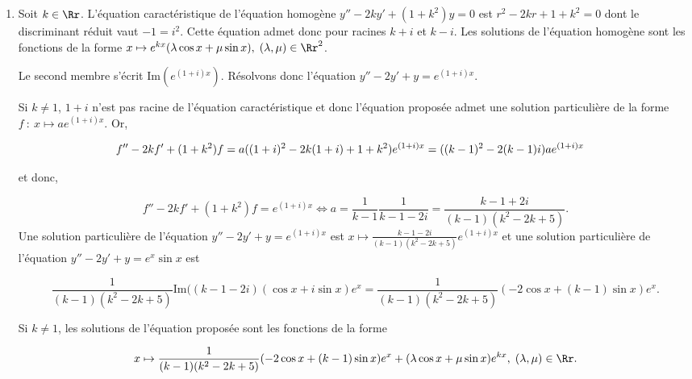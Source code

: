 {{\begin{enumerate}
\begin{align*}\ensuremath
f''-2f'+f&=(a+2a+a)e^{-x}=4ae^{-x}
\end{align*}

puis,

$$f''-2f'+f=e^{-x}\Leftrightarrow a=\frac{1}{4}.$$
Une solution particulière de l'équation $y''-2y'+y=e^{-x}$ est $x\mapsto\frac{1}{4}e^{-x}$.

Les solutions sur $\Rr$ de l'équation proposée sont les fonctions de la forme
$x\mapsto(\frac{x^2}{4}+\lambda x+\mu)e^x+\frac{1}{8}e^{-x}$, $(\lambda,\mu)\in\Rr^2$.

\item  Soit $k\in\Rr$. L'équation caractéristique de l'équation homogène $y''-2ky'+(1+k^2)y=0$ est $r^2-2kr+1+k^2=0$
dont le discriminant réduit vaut $-1=i^2$. Cette équation admet donc pour racines $k+i$ et $k-i$. Les solutions de
l'équation homogène sont les fonctions de la forme $x\mapsto e^{kx}(\lambda\cos x+\mu\sin x),\;(\lambda,\mu)\in\Rr^2$.

Le second membre s'écrit $\mbox{Im}(e^{(1+i)x})$. Résolvons donc l'équation $y''-2y'+y=e^{(1+i)x}$.

Si $k\neq1$, $1+i$ n'est pas racine de l'équation caractéristique et donc
l'équation proposée admet une solution particulière de la forme $f~:~x\mapsto ae^{(1+i)x}$. Or,

\begin{align*}\ensuremath
f''-2kf'+(1+k^2)f&=a((1+i)^2-2k(1+i)+1+k^2)e^{(1+i)x}=((k-1)^2-2(k-1)i)ae^{(1+i)x}
\end{align*}

et donc,

$$f''-2kf'+(1+k^2)f=e^{(1+i)x}\Leftrightarrow a=\frac{1}{k-1}\frac{1}{k-1-2i}=\frac{k-1+2i}{(k-1)(k^2-2k+5)}.$$
Une solution particulière de l'équation $y''-2y'+y=e^{(1+i)x}$ est $x\mapsto\frac{k-1-2i}{(k-1)(k^2-2k+5)}e^{(1+i)x}$
et une solution particulière de l'équation $y''-2y'+y=e^{x}\sin x$ est

$$\frac{1}{(k-1)(k^2-2k+5)}\mbox{Im}((k-1-2i)(\cos x+i\sin x)e^x=\frac{1}{(k-1)(k^2-2k+5)}(-2\cos x+(k-1)\sin x)e^x.$$

Si $k\neq1$, les solutions de l'équation proposée sont les fonctions de la forme

$$x\mapsto\frac{1}{(k-1)(k^2-2k+5)}(-2\cos x+(k-1)\sin x)e^x+(\lambda\cos x+\mu\sin x)e^{kx},\;(\lambda,\mu)\in\Rr.$$

\end{enumerate}}
}